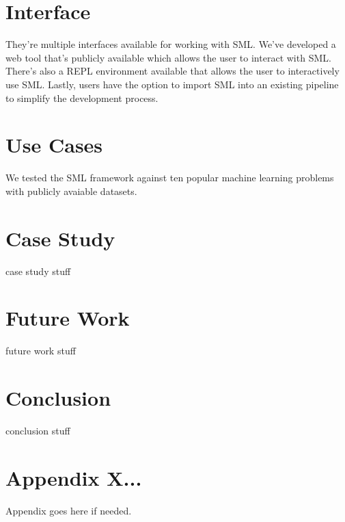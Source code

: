 \documentclass[jair,twoside,11pt,theapa]{article}
\begin{document}
\section{Interface}
\label{interface}

They're multiple interfaces available for working with SML. We've developed a web tool that's publicly available which allows the user to interact with SML. There's also a REPL environment available that allows the user to interactively use SML. Lastly, users have the option to import SML into an existing pipeline to simplify the development process.

\section{Use Cases}
\label{use-cases}

We tested the SML framework against ten popular machine learning problems with publicly avaiable datasets. 

\section{Case Study}
\label{case-study}
case study stuff

\section{Future Work}
\label{future-work}

future work stuff

\section{Conclusion}
\label{conclusion}
conclusion stuff


\appendix
\section*{Appendix X...}

Appendix goes here if needed.

\vskip 0.2in


\end{document}
